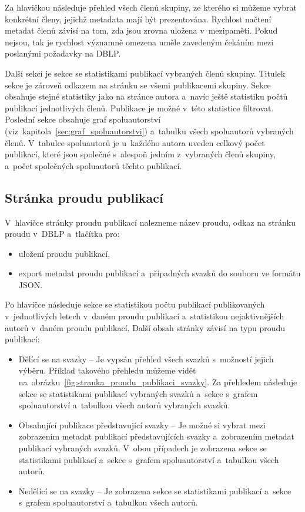 \documentclass[
  biblatex,
  sourcecodes,
  glossaries,
  index
]{kidiplom}
\begin{document}
Za hlavičkou následuje přehled všech členů skupiny, ze kterého si můžeme vybrat konkrétní členy, jejichž metadata mají být prezentována. Rychlost načtení metadat členů závisí na tom, zda jsou zrovna uložena v~mezipaměti. Pokud nejsou, tak je rychlost významně omezena uměle zavedeným čekáním mezi poslanými požadavky na DBLP.

Další sekcí je sekce se statistikami publikací vybraných členů skupiny. Titulek sekce je zároveň odkazem na stránku se všemi publikacemi skupiny. Sekce obsahuje stejné statistiky jako na stránce autora a~navíc ještě statistiku počtů publikací jednotlivých členů. Publikace je možné v~této statistice filtrovat. Poslední sekce obsahuje graf spoluautorství (viz~kapitola~\ref{sec:graf_spoluautorstvi}) a~tabulku všech spoluautorů vybraných členů. V~tabulce spoluautorů je u~každého autora uveden celkový počet publikací, které jsou společné s~alespoň jedním z~vybraných členů skupiny, a~počet společných spoluautorů těchto publikací.

\subsection{Stránka proudu publikací}

V~hlavičce stránky proudu publikací nalezneme název proudu, odkaz na stránku proudu v~DBLP a~tlačítka pro:
\begin{itemize}
\item uložení proudu publikací,
\item export metadat proudu publikací a~případných svazků do souboru ve formátu JSON.
\end{itemize}

Po hlavičce následuje sekce se statistikou počtu publikací publikovaných v~jednotlivých letech v~daném proudu publikací a~statistikou nejaktivnějších autorů v~daném proudu publikací. Další obsah stránky závisí na typu proudu publikací:
\begin{itemize}
\item Dělící se na svazky -- Je vypsán přehled všech svazků s~možností jejich výběru. Příklad takového přehledu můžeme vidět na~obrázku~\ref{fig:stranka_proudu_publikaci_svazky}. Za přehledem následuje sekce se statistikami publikací vybraných svazků a~sekce s~grafem spoluautorství a~tabulkou všech autorů vybraných svazků.
\item Obsahující publikace představující svazky -- Je možné si vybrat mezi zobrazením metadat publikací představujících svazky a~zobrazením metadat publikací vybraných svazků. V~obou případech je zobrazena sekce se statistikami publikací a~sekce s~grafem spoluautorství a~tabulkou všech autorů.
\item Nedělící se na svazky -- Je zobrazena sekce se statistikami publikací a~sekce s~grafem spoluautorství a~tabulkou všech autorů.
\end{itemize}
\end{document}
